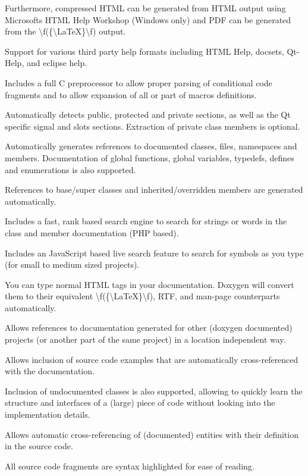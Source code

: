 \begin{DoxyItemize}
 Furthermore, compressed H\+T\+ML can be generated from H\+T\+ML output using Microsoft\textquotesingle{}s H\+T\+ML Help Workshop (Windows only) and P\+DF can be generated from the \textbackslash{}f(\{\textbackslash{}\+La\+TeX\}\textbackslash{}f) output. 
\item Support for various third party help formats including H\+T\+ML Help, docsets, Qt-\/\+Help, and eclipse help. 
\item Includes a full C preprocessor to allow proper parsing of conditional code fragments and to allow expansion of all or part of macros definitions. 
\item Automatically detects public, protected and private sections, as well as the Qt specific signal and slots sections. Extraction of private class members is optional. 
\item Automatically generates references to documented classes, files, namespaces and members. Documentation of global functions, global variables, typedefs, defines and enumerations is also supported. 
\item References to base/super classes and inherited/overridden members are generated automatically. 
\item Includes a fast, rank based search engine to search for strings or words in the class and member documentation (P\+HP based). 
\item Includes an Java\+Script based live search feature to search for symbols as you type (for small to medium sized projects). 
\item You can type normal H\+T\+ML tags in your documentation. Doxygen will convert them to their equivalent \textbackslash{}f(\{\textbackslash{}\+La\+TeX\}\textbackslash{}f), R\+TF, and man-\/page counterparts automatically. 
\item Allows references to documentation generated for other (doxygen documented) projects (or another part of the same project) in a location independent way. 
\item Allows inclusion of source code examples that are automatically cross-\/referenced with the documentation. 
\item Inclusion of undocumented classes is also supported, allowing to quickly learn the structure and interfaces of a (large) piece of code without looking into the implementation details. 
\item Allows automatic cross-\/referencing of (documented) entities with their definition in the source code. 
\item All source code fragments are syntax highlighted for ease of reading. 

\end{DoxyItemize}
